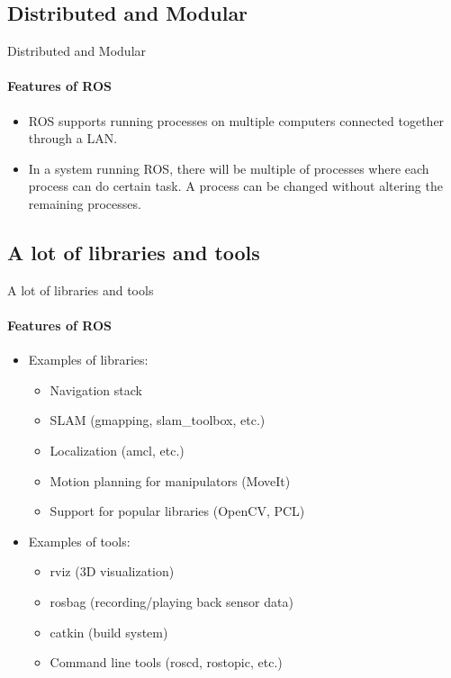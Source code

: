 \documentclass{beamer}
\begin{document}
\subsection{Distributed and Modular}

\begin{frame}{Distributed and Modular}
    \framesubtitle{Features of ROS}    
    \begin{itemize}
        \item ROS supports running processes on multiple computers connected together through a LAN.
        \item In a system running ROS, there will be multiple of processes where each process can do
        certain task. A process can be changed without altering the remaining processes.
    \end{itemize}
\end{frame}


\subsection{A lot of libraries and tools}

\begin{frame}{A lot of libraries and tools}
    \framesubtitle{Features of ROS}    
    \begin{itemize}
        \item Examples of libraries:
            \begin{itemize}
                \item Navigation stack
                \item SLAM (gmapping, slam\_toolbox, etc.)
                \item Localization (amcl, etc.)
                \item Motion planning for manipulators (MoveIt)
                \item Support for popular libraries (OpenCV, PCL)
            \end{itemize}
            
        \item Examples of tools:
            \begin{itemize}
                \item rviz (3D visualization)
                \item rosbag (recording/playing back sensor data)
                \item catkin (build system)
                \item Command line tools (roscd, rostopic, etc.)
            \end{itemize}        
    \end{itemize}
    
\end{frame}
\end{document}
